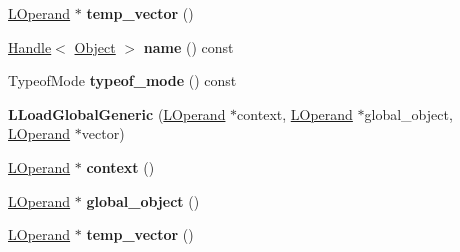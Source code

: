 \begin{DoxyCompactItemize}
\item 
\hyperlink{classv8_1_1internal_1_1_l_operand}{L\+Operand} $\ast$ {\bfseries temp\+\_\+vector} ()\hypertarget{classv8_1_1internal_1_1_l_load_global_generic_a6e6428d159408fa7d9a31d38cc08919c}{}\label{classv8_1_1internal_1_1_l_load_global_generic_a6e6428d159408fa7d9a31d38cc08919c}

\item 
\hyperlink{classv8_1_1internal_1_1_handle}{Handle}$<$ \hyperlink{classv8_1_1internal_1_1_object}{Object} $>$ {\bfseries name} () const \hypertarget{classv8_1_1internal_1_1_l_load_global_generic_a8986cdf04702fb63aee12526199431ab}{}\label{classv8_1_1internal_1_1_l_load_global_generic_a8986cdf04702fb63aee12526199431ab}

\item 
Typeof\+Mode {\bfseries typeof\+\_\+mode} () const \hypertarget{classv8_1_1internal_1_1_l_load_global_generic_a92314902b26af0eba30f17b3c9e9d768}{}\label{classv8_1_1internal_1_1_l_load_global_generic_a92314902b26af0eba30f17b3c9e9d768}

\item 
{\bfseries L\+Load\+Global\+Generic} (\hyperlink{classv8_1_1internal_1_1_l_operand}{L\+Operand} $\ast$context, \hyperlink{classv8_1_1internal_1_1_l_operand}{L\+Operand} $\ast$global\+\_\+object, \hyperlink{classv8_1_1internal_1_1_l_operand}{L\+Operand} $\ast$vector)\hypertarget{classv8_1_1internal_1_1_l_load_global_generic_a5992cad6cdc59da767d3d35fdbf4c4f7}{}\label{classv8_1_1internal_1_1_l_load_global_generic_a5992cad6cdc59da767d3d35fdbf4c4f7}

\item 
\hyperlink{classv8_1_1internal_1_1_l_operand}{L\+Operand} $\ast$ {\bfseries context} ()\hypertarget{classv8_1_1internal_1_1_l_load_global_generic_acb9446dcc83f4319988b01ff0d957bf6}{}\label{classv8_1_1internal_1_1_l_load_global_generic_acb9446dcc83f4319988b01ff0d957bf6}

\item 
\hyperlink{classv8_1_1internal_1_1_l_operand}{L\+Operand} $\ast$ {\bfseries global\+\_\+object} ()\hypertarget{classv8_1_1internal_1_1_l_load_global_generic_a43bc76ffc93765b0231ba74a702acb19}{}\label{classv8_1_1internal_1_1_l_load_global_generic_a43bc76ffc93765b0231ba74a702acb19}

\item 
\hyperlink{classv8_1_1internal_1_1_l_operand}{L\+Operand} $\ast$ {\bfseries temp\+\_\+vector} ()\hypertarget{classv8_1_1internal_1_1_l_load_global_generic_a6e6428d159408fa7d9a31d38cc08919c}{}\label{classv8_1_1internal_1_1_l_load_global_generic_a6e6428d159408fa7d9a31d38cc08919c}


\end{DoxyCompactItemize}
